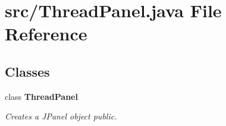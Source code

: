 \section{src/\+Thread\+Panel.java File Reference}
\label{_thread_panel_8java}
\subsection*{Classes}
\begin{DoxyCompactItemize}
\item 
class {\bf Thread\+Panel}
\begin{DoxyCompactList}\small\item\em Creates a J\+Panel object  public. \end{DoxyCompactList}\end{DoxyCompactItemize}
